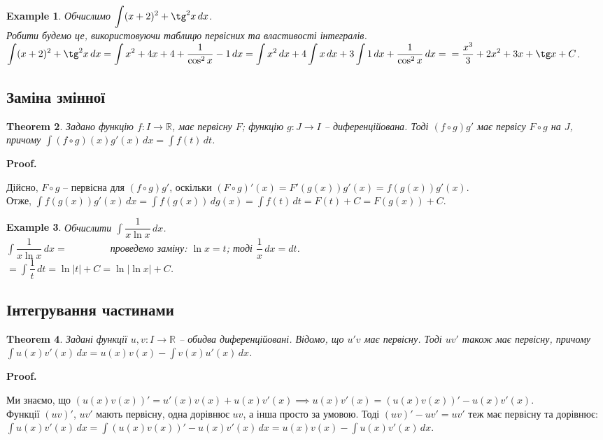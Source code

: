 \documentclass[a4paper, 10pt]{article}
\makeatletter
\def\huge{\displaystyle}
\theoremstyle{theoremdd}
\newtheorem{theorem}{Theorem}[subsection]
\theoremstyle{theoremdd}
\theoremstyle{theoremdd}
\theoremstyle{theoremdd}
\theoremstyle{theoremdd}
\newtheorem{example}[theorem]{Example}
\theoremstyle{theoremdd}
\theoremstyle{theoremdd}
\theoremstyle{theoremdd}
\theoremstyle{theoremdd}
\renewenvironment{proof}[1][Proof.\\]{\par
\pushQED{\hfill \qed}%
\normalfont \topsep6\p@\@plus6\p@\relax
\trivlist
\item\relax
{\bfseries
#1\@addpunct{.}}\hspace\labelsep\ignorespaces
}{%
\popQED\endtrivlist\@endpefalse
}
\makeatother
\begin{document}
\begin{example}
Обчислимо $\huge\int (x+2)^2 + \tg^2 x\,dx$.\\
Робити будемо це, використовуючи таблицю первісних та властивості інтегралів.\\
$\huge\int (x+2)^2 + \tg^2 x\,dx = \int x^2 + 4x + 4 + \dfrac{1}{\cos^2 x} - 1\,dx = \int x^2\,dx + 4 \int x\,dx + 3 \int 1\,dx + \dfrac{1}{\cos^2 x}\,dx = \\ = \dfrac{x^3}{3} + 2x^2 + 3x + \tg x + C$.
\end{example}

\subsection{Заміна змінної}
\begin{theorem} Задано функцію $f \colon I \to \mathbb{R}$, має первісну $F$; функцію $g \colon J \to I$ -- диференційована. Тоді $(f \circ g) g'$ має первісу $F \circ g$ на $J$, причому $\huge \int (f \circ g)(x) g'(x)\,dx = \int f(t)\,dt$.
\end{theorem}

\begin{proof}
Дійсно, $F \circ g$ -- первісна для $(f \circ g) g'$, оскільки $(F \circ g)' (x) = F'(g(x)) g'(x) = f(g(x))g'(x)$. \\
Отже, $\huge \int f(g(x)) g'(x)\,dx = \int f(g(x)) \,dg(x) = \int f(t) \,dt = F(t) + C = F(g(x)) + C$.
\end{proof}

\begin{example} Обчислити $\huge \int \dfrac{1}{x \ln x} \,dx$.\\
$\huge \int \dfrac{1}{x \ln x} \,dx \boxed{=} \qquad\qquad$ проведемо заміну: $\ln x = t$; тоді $\dfrac{1}{x}\,dx = dt$.\\
$\boxed{=} \huge \int \dfrac{1}{t}\,dt = \ln |t| + C = \ln |\ln x| + C$.
\end{example}

\subsection{Інтегрування частинами}
\begin{theorem}
Задані функції $u,v \colon I \to \mathbb{R}$ -- обидва диференційовані. Відомо, що $u'v$ має первісну. Тоді $uv'$ також має первісну, причому $\huge\int u(x)v'(x)\,dx = u(x)v(x) - \int v(x)u'(x)\,dx$.
\end{theorem}

\begin{proof}
Ми знаємо, що $(u(x)v(x))' = u'(x)v(x) + u(x)v'(x) \implies u(x)v'(x) = (u(x)v(x))' - u(x)v'(x)$.\\
Функції $(uv)'$, $uv'$ мають первісну, одна дорівнює $uv$, а інша просто за умовою. Тоді $(uv)' - uv' = uv'$ теж має первісну та дорівнює:\\
$\huge\int u(x)v'(x)\,dx = \int (u(x)v(x))' - u(x)v'(x)\,dx = u(x)v(x) - \int u(x)v'(x)\,dx$.
\end{proof}
\end{document}

